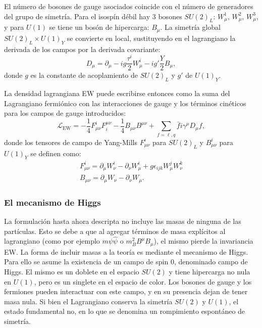 El número de bosones de gauge asociados coincide con el número de generadores del grupo de simetría. Para el isospín débil hay 3 bosones \(SU(2)_L\): \(W_{\mu}^1,\, W_{\mu}^2,\, W_{\mu}^3\), y para \(U(1)\) se tiene un bosón de hipercarga: \(B_{\mu}\).
La simetría global \(SU(2)_L \times U(1)_Y\) se convierte en local, sustituyendo en el lagrangiano la derivada de los campos por la derivada covariante:
\begin{equation}
    \label{eq:theory:sm:mathematical:ew:covariant_derivative}
    D_{\mu} = \partial_{\mu} - ig \frac{\tau^i}{2} W_{\mu}^i - i g' \frac{Y}{2} B_{\mu},
\end{equation}
donde \(g\) es la constante de acoplamiento de \(SU(2)_L\) y \(g'\) de \(U(1)_Y\).

La densidad lagrangiana \ac{EW} puede escribirse entonces como la suma del Lagrangiano fermiónico con las interacciones de gauge y los términos cinéticos para los campos de gauge introducidos:
\begin{equation}
    \mathcal{L}_{\text{EW}} = 
    - \frac{1}{4} F_{\mu\nu}^i F^{\mu\nu}_i
    - \frac{1}{4} B_{\mu\nu} B^{\mu\nu}
    + \sum_{f = \ell, q} \bar{f} i \gamma^{\mu} D_{\mu} f,
\end{equation}
donde los tensores de campo de Yang-Mills \(F_{\mu\nu}^i\) para \(SU(2)_L\) y \(B_{\mu\nu}^i\) para \(U(1)_Y\) se definen como:
\begin{gather}
    F_{\mu\nu}^i = \partial_{\mu} W_{\nu}^i  -  \partial_{\nu} W_{\mu}^i + g \epsilon_{ijk} W_{\mu}^jW_{\nu}^k \\
    B_{\mu\nu} = \partial_{\mu} W_{\nu}  -  \partial_{\nu} W_{\mu}.
\end{gather}




\subsubsection{El mecanismo de Higgs}

La formulación hasta ahora descripta no incluye las masas de ninguna de las partículas. Esto se debe a que al agregar términos de masa explícitos al lagrangiano (como por ejemplo \(m \psi \hat{\psi}\) o \(m_B^2 B^{\mu}B_{\mu}\)), el mismo pierde la invariancia \ac{EW}. La forma de incluir masas a la teoría es mediante el mecanismo de Higgs. Para ello se asume la existencia de un campo de spin 0, denominado campo de Higgs. El mismo es un doblete en el espacio \(SU(2)\) y tiene hipercarga no nula en \(U(1)\), pero es un singlete en el espacio de color. Los bosones de gauge y los fermiones pueden interactuar con este campo, y en su presencia dejan de tener masa nula. Si bien el Lagrangiano conserva la simetría \(SU(2)\) y \(U(1)\), el estado fundamental no, en lo que se denomina un rompimiento espontáneo de simetría.

